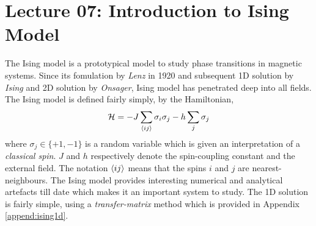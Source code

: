 \section*{Lecture 07: Introduction to Ising Model}
The Ising model is a prototypical model to study phase transitions in magnetic systems. Since its fomulation by \textit{Lenz} in 1920 and subsequent 1D solution by \textit{Ising} and 2D solution by \textit{Onsager}, Ising model has penetrated deep into all fields. The Ising model is defined fairly simply, by the Hamiltonian,
\begin{align}\label{isingham}
    \mathcal H = -J \sum\limits_{\left\langle ij \right\rangle}\sigma_i \sigma_j -h\sum\limits_j \sigma_j
\end{align}
where $\sigma_j \in \{+1, -1\}$ is a random variable which is given an interpretation of a \textit{classical spin}. $J$ and $h$ respectively denote the spin-coupling constant and the external field. The notation $\left\langle ij \right\rangle$ means that the spins $i$ and $j$ are nearest-neighbours. The Ising model provides interesting numerical and analytical artefacts till date which makes it an important system to study. The 1D solution is fairly simple, using a \textit{transfer-matrix} method which is provided in Appendix \ref{append:ising1d}.

